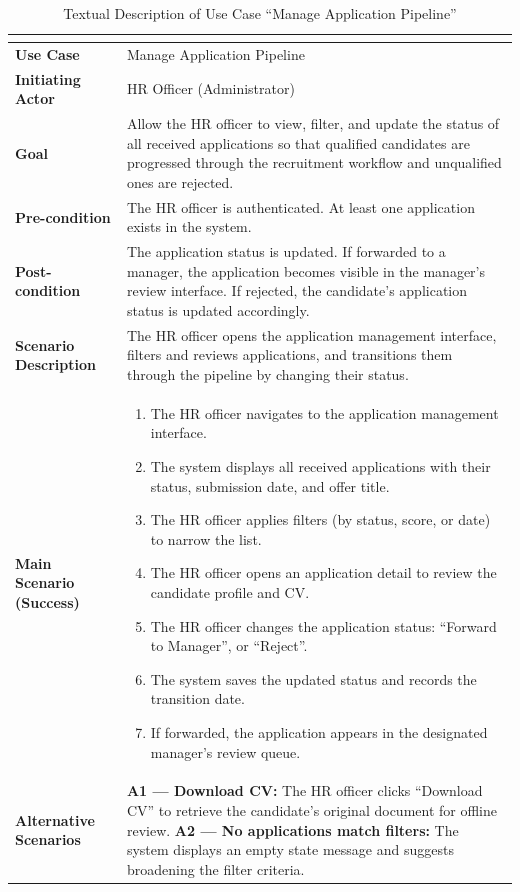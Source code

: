 \setlength{\tabcolsep}{4pt}
\renewcommand{\arraystretch}{1.6}
\begin{table}[H]
\centering
\small
\begin{tabularx}{\textwidth}{|>{\bfseries\arraybackslash}p{4cm}|X|}
\hline
\rowcolor{headerblue}
\multicolumn{2}{|c|}{\textbf{Use Case: Manage Application Pipeline}} \\
\hline
Use Case            & Manage Application Pipeline \\
\hline
Initiating Actor    & HR Officer (Administrator) \\
\hline
Goal                & Allow the HR officer to view, filter, and update the status of all received applications so that qualified candidates are progressed through the recruitment workflow and unqualified ones are rejected. \\
\hline
Pre-condition       & The HR officer is authenticated. At least one application exists in the system. \\
\hline
Post-condition      & The application status is updated. If forwarded to a manager, the application becomes visible in the manager's review interface. If rejected, the candidate's application status is updated accordingly. \\
\hline
Scenario Description &
The HR officer opens the application management interface, filters and reviews applications, and transitions them through the pipeline by changing their status. \\
\hline
Main Scenario (Success) &
\begin{enumerate}[leftmargin=*, label=\arabic*., topsep=0pt, itemsep=0pt]
    \item The HR officer navigates to the application management interface.
    \item The system displays all received applications with their status, submission date, and offer title.
    \item The HR officer applies filters (by status, score, or date) to narrow the list.
    \item The HR officer opens an application detail to review the candidate profile and CV.
    \item The HR officer changes the application status: ``Forward to Manager'', or ``Reject''.
    \item The system saves the updated status and records the transition date.
    \item If forwarded, the application appears in the designated manager's review queue.
\end{enumerate} \\
\hline
Alternative Scenarios &
\textbf{A1 --- Download CV:} The HR officer clicks ``Download CV'' to retrieve the candidate's original document for offline review. \newline
\textbf{A2 --- No applications match filters:} The system displays an empty state message and suggests broadening the filter criteria. \\
\hline
\end{tabularx}
\caption{Textual Description of Use Case ``Manage Application Pipeline''}
\label{tab:uc-pipeline}
\end{table}
\normalsize
\setlength{\tabcolsep}{6pt}
\renewcommand{\arraystretch}{1}

